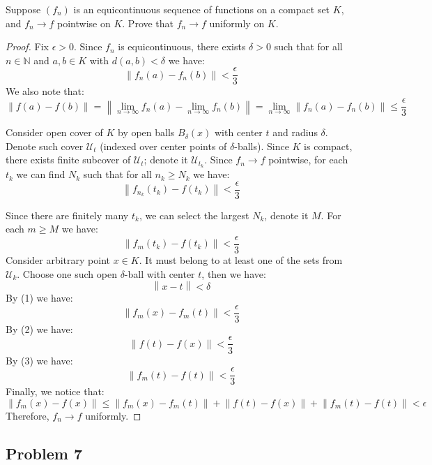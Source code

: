 \documentclass{article}
\newcommand{\N}{\mathbb{N}}
\newcommand{\norm}[1]{\left\lVert #1 \right\rVert}
\begin{document}
\begin{tcolorbox}
Suppose $(f_n)$ is an equicontinuous sequence of functions on a compact set $K$, and $f_n \to f$ pointwise on $K$.
Prove that $f_n \to f$ uniformly on $K$.
\end{tcolorbox}

\begin{proof}

Fix $\epsilon>0$. Since $f_n$ is equicontinuous, there exists $\delta>0$ such that for all $n \in \N$ and $a, b \in K$ with $d(a,b)<\delta$ we have:
\begin{equation}
    \norm{ f_n(a) - f_n(b) } < \frac{\epsilon}{3}
\end{equation}
We also note that:
\begin{equation}
    \norm{ f(a) - f(b) }
    = \norm{ \lim_{n\to\infty} f_n(a) - \lim_{n\to\infty} f_n(b) } 
    = \lim_{n\to\infty} \norm{ f_n(a) - f_n(b) }
    \leq \frac{\epsilon}{3}
\end{equation}

Consider open cover of $K$ by open balls $B_\delta(x)$ with center $t$ and radius $\delta$. Denote such cover $\mathcal{U}_t$ (indexed over center points of $\delta$-balls).
Since $K$ is compact, there exists finite subcover of $\mathcal{U}_t$; denote it $\mathcal{U}_{t_k}$. Since $f_n \to f$ pointwise, for each $t_k$ we can find $N_k$ such that for all $n_k \geq N_k$ we have:
\[ \norm{ f_{n_k}(t_k) - f(t_k) } < \frac{\epsilon}{3} \]

Since there are finitely many $t_k$, we can select the largest $N_k$, denote it $M$. For each $m \geq M$ we have:
\begin{equation}
    \norm{ f_m(t_k) - f(t_k) } < \frac{\epsilon}{3}
\end{equation}
Consider arbitrary point $x \in K$.
It must belong to at least one of the sets from $\mathcal{U}_k$.
Choose one such open $\delta$-ball with center $t$, then we have:
\[ \norm{ x - t } < \delta \]
By (1) we have:
\[ \norm{ f_m(x) - f_m(t) } < \frac{\epsilon}{3} \]
By (2) we have:
\[ \norm{ f(t) - f(x) } < \frac{\epsilon}{3} \]
By (3) we have:
\[ \norm{ f_m(t) - f(t) } < \frac{\epsilon}{3} \]
Finally, we notice that:
\[
\norm{ f_m(x) - f(x) } 
\leq
\norm{ f_m(x) - f_m(t) } 
+ \norm{ f(t) - f(x) } 
+ \norm{ f_m(t) - f(t) }
<
\epsilon
\]
Therefore, $f_n \to f$ uniformly.

\end{proof}


\subsection*{Problem 7}
\end{document}
